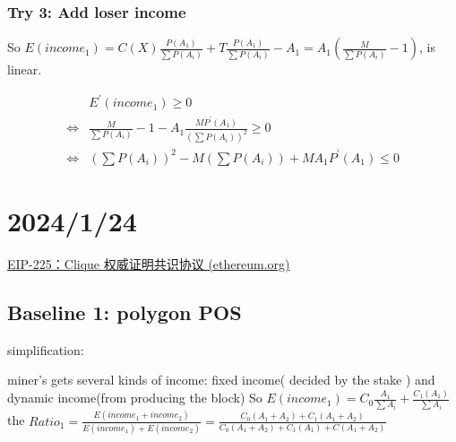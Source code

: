 \documentclass{article}
\begin{document}
\subsubsection{Try 3: Add loser income}
\par So $E(income_1)=C(X)\frac{P(A_1)}{\sum P(A_i)}+T\frac{P(A_1)}{\sum P(A_i)}-A_1=A_1(\frac{M}{\sum P(A_i)}-1)$, is linear.
 \par
 \begin{equation}
\begin{aligned}
&E^{'}(income_1)\ge 0
\\\Longleftrightarrow&\frac{M}{\sum P(A_i)}-1-A_1\frac{MP^{'}(A_1)}{(\sum P(A_i))^2}\ge 0
\\\Longleftrightarrow&(\sum P(A_i))^2-M(\sum P(A_i))+MA_1P^{'}(A_1)\le 0
\end{aligned}
\end{equation}

\section{2024/1/24}
\href{https://eips.ethereum.org/EIPS/eip-225}{EIP-225：Clique 权威证明共识协议 (ethereum.org)}  
\subsection{Baseline 1: polygon POS }
\par simplification:
\par miner's gets several kinds of income: fixed income( decided by the stake ) and dynamic income(from producing the block)
So $E(income_1)=C_0\frac{A_1}{\sum A_i}+\frac{C_1(A_1)}{\sum A_i}$
the $Ratio_1=\frac{E(income_1+income_2)}{E(income_1)+E(income_2)}=\frac{C_0(A_1+A_2)+C_1(A_1+A_2)}{C_0(A_1+A_2)+C_1(A_1)+C(A_1+A_2)}$
\end{document}
